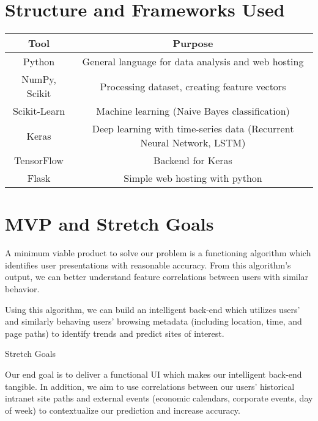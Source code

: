 \documentclass{article}
\begin{document}
\section*{Structure and Frameworks Used}
\begin{center}
 \begin{tabular}{|c | c |} 
 \hline
 Tool & Purpose \\ [0.5ex] 
 \hline\hline
 Python & General language for data analysis and web hosting\\ 
 \hline
 NumPy, Scikit & Processing dataset, creating feature vectors\\ 
 \hline
 Scikit-Learn & Machine learning (Naive Bayes classification) \\ 
 \hline
 Keras & Deep learning with time-series data (Recurrent Neural Network, LSTM) \\ 
 \hline
 TensorFlow & Backend for Keras \\ 
 \hline
 Flask & Simple web hosting with python \\ 
 \hline
\end{tabular}
\end{center}



\clearpage
\section*{MVP and Stretch Goals}
A minimum viable product to solve our problem is a functioning algorithm which identifies user presentations with reasonable accuracy. From this algorithm's output, we can better understand feature correlations between users with similar behavior.

Using this algorithm, we can build an intelligent back-end which utilizes users' and similarly behaving users' browsing metadata (including location, time, and page paths) to identify trends and predict sites of interest.

Stretch Goals

Our end goal is to deliver a functional UI which makes our intelligent back-end tangible. In addition, we aim to use correlations between our users' historical intranet site paths and external events (economic calendars, corporate events, day of week) to contextualize our prediction and increase accuracy.



\end{document}
